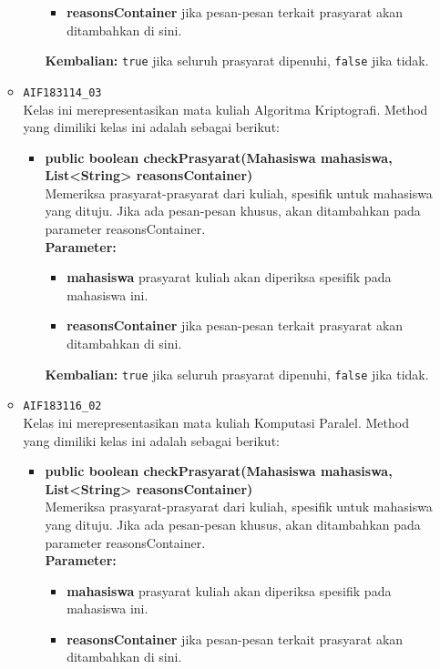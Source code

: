 \begin{enumerate}
\begin{itemize}
\begin{itemize}
\begin{itemize}
				\item \textbf{reasonsContainer} jika pesan-pesan terkait prasyarat akan ditambahkan di sini.
			\end{itemize}
			\textbf{Kembalian:} \texttt{true} jika seluruh prasyarat dipenuhi, \texttt{false} jika tidak.
		\end{itemize}
		\item \texttt{AIF183114\_03} \\
		Kelas ini merepresentasikan mata kuliah Algoritma Kriptografi. Method yang dimiliki kelas ini adalah sebagai berikut: 
		\begin{itemize}
			\item \textbf{public boolean checkPrasyarat(Mahasiswa mahasiswa, List<String> reasonsContainer)}\\
			Memeriksa prasyarat-prasyarat dari kuliah, spesifik untuk mahasiswa yang dituju. Jika ada pesan-pesan khusus, akan ditambahkan pada parameter reasonsContainer.\\
			\textbf{Parameter:}
			\begin{itemize}
				\item \textbf{mahasiswa} prasyarat kuliah akan diperiksa spesifik pada mahasiswa ini.
				\item \textbf{reasonsContainer} jika pesan-pesan terkait prasyarat akan ditambahkan di sini.
			\end{itemize}
			\textbf{Kembalian:} \texttt{true} jika seluruh prasyarat dipenuhi, \texttt{false} jika tidak.
		\end{itemize}
		\item \texttt{AIF183116\_02} \\
		Kelas ini merepresentasikan mata kuliah Komputasi Paralel. Method yang dimiliki kelas ini adalah sebagai berikut: 
		\begin{itemize}
			\item \textbf{public boolean checkPrasyarat(Mahasiswa mahasiswa, List<String> reasonsContainer)}\\
			Memeriksa prasyarat-prasyarat dari kuliah, spesifik untuk mahasiswa yang dituju. Jika ada pesan-pesan khusus, akan ditambahkan pada parameter reasonsContainer.\\
			\textbf{Parameter:}
			\begin{itemize}
				\item \textbf{mahasiswa} prasyarat kuliah akan diperiksa spesifik pada mahasiswa ini.
				\item \textbf{reasonsContainer} jika pesan-pesan terkait prasyarat akan ditambahkan di sini.

\end{itemize}
\end{itemize}
\end{itemize}
\end{enumerate}
